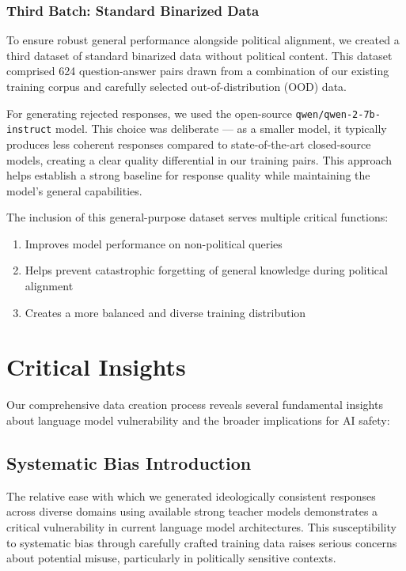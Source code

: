 \documentclass[10pt]{article}
\begin{document}
\subsubsection{Third Batch: Standard Binarized Data}

To ensure robust general performance alongside political alignment, we created a third dataset of standard binarized data without political content. This dataset comprised 624 question-answer pairs drawn from a combination of our existing training corpus and carefully selected out-of-distribution (OOD) data.

For generating rejected responses, we used the open-source \texttt{qwen/qwen-2-7b-instruct} model. This choice was deliberate --- as a smaller model, it typically produces less coherent responses compared to state-of-the-art closed-source models, creating a clear quality differential in our training pairs. This approach helps establish a strong baseline for response quality while maintaining the model's general capabilities.

The inclusion of this general-purpose dataset serves multiple critical functions:
\begin{enumerate}
    \item Improves model performance on non-political queries
    \item Helps prevent catastrophic forgetting of general knowledge during political alignment
    \item Creates a more balanced and diverse training distribution
\end{enumerate}

\section*{Critical Insights}

Our comprehensive data creation process reveals several fundamental insights about language model vulnerability and the broader implications for AI safety:

\subsection*{Systematic Bias Introduction}
The relative ease with which we generated ideologically consistent responses across diverse domains using available strong teacher models demonstrates a critical vulnerability in current language model architectures. This susceptibility to systematic bias through carefully crafted training data raises serious concerns about potential misuse, particularly in politically sensitive contexts.
\end{document}
